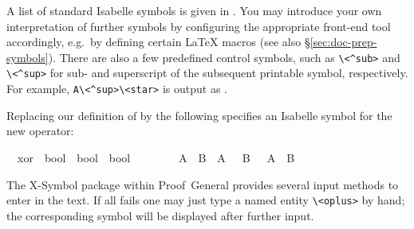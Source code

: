 \begin{isabellebody}
\begin{isamarkuptext}
  A list of standard Isabelle symbols is given in
  \cite[appendix~A]{isabelle-sys}.  You may introduce your own
  interpretation of further symbols by configuring the appropriate
  front-end tool accordingly, e.g.\ by defining certain {\LaTeX}
  macros (see also \S\ref{sec:doc-prep-symbols}).  There are also a
  few predefined control symbols, such as \verb,\,\verb,<^sub>, and
  \verb,\,\verb,<^sup>, for sub- and superscript of the subsequent
  printable symbol, respectively.  For example, \verb,A\<^sup>\<star>, is
  output as .

  \medskip Replacing our definition of  by the following
  specifies an Isabelle symbol for the new operator:%
\end{isamarkuptext}%
\isamarkuptrue%
\isamarkupfalse%
\isamarkupfalse%
\isanewline
\ \ xor\ {\isacharcolon}{\isacharcolon}\ {\isachardoublequote}bool\ {\isasymRightarrow}\ bool\ {\isasymRightarrow}\ bool{\isachardoublequote}\ \ \ \ {\isacharparenleft}\ {\isachardoublequote}{\isasymoplus}{\isachardoublequote}\ {}{}{\isacharparenright}\isanewline
\ \ {\isachardoublequote}A\ {\isasymoplus}\ B\ {\isasymequiv}\ {\isacharparenleft}A\ {\isasymand}\ {\isasymnot}\ B{\isacharparenright}\ {\isasymor}\ {\isacharparenleft}{\isasymnot}\ A\ {\isasymand}\ B{\isacharparenright}{\isachardoublequote}\isamarkupfalse%
\isamarkupfalse%
%
\begin{isamarkuptext}%
\noindent The X-Symbol package within Proof~General provides several
  input methods to enter \isa{{\isasymoplus}} in the text.  If all fails one may
  just type a named entity \verb,\,\verb,<oplus>, by hand; the
  corresponding symbol will be displayed after further input.


\end{isamarkuptext}
\end{isabellebody}
